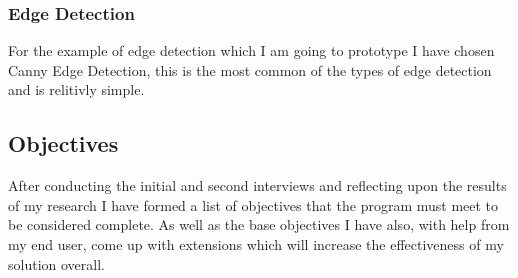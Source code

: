 \begin{flushleft}
        \subsubsection{Edge Detection}
        For the example of edge detection which I am going to prototype I have chosen Canny Edge Detection, this is the most common of the types of edge detection and is relitivly simple. 


        \subsection{Objectives}
        \large
        
        
        
        After conducting the initial and second interviews and reflecting upon the results of my research I have formed a list of objectives that the program must meet to be considered 
        complete. As well as the base objectives I have also, with help from my end user, come up with extensions which will increase the effectiveness of my solution overall. \\
        \bk
        
        \renewcommand{\labelenumii}{\arabic{enumi}.\arabic{enumii}}
        \renewcommand{\labelenumiii}{\arabic{enumi}.\arabic{enumii}.\arabic{enumiii}}
        \renewcommand{\labelenumiv}{\arabic{enumi}.\arabic{enumii}.\arabic{enumiii}.\arabic{enumiv}}
        

\end{flushleft}
